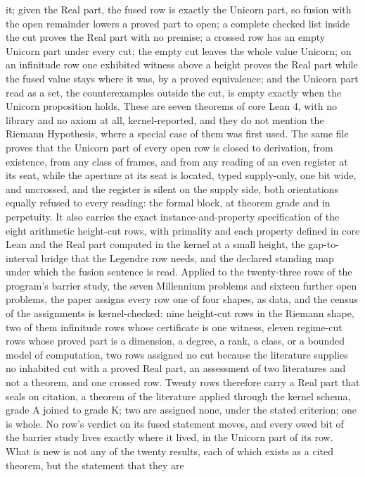 \documentclass[10pt,twocolumn]{article}
\begin{document}
{\begin{minipage}{\textwidth}
{it; given the Real part, the fused row is exactly the Unicorn part, so
fusion with the open remainder lowers a proved part to open; a complete
checked list inside the cut proves the Real part with no premise; a
crossed row has an empty Unicorn part under every cut; the empty cut
leaves the whole value Unicorn; on an infinitude row one exhibited
witness above a height proves the Real part while the fused value stays
where it was, by a proved equivalence; and the Unicorn part read as a
set, the counterexamples outside the cut, is empty exactly when the
Unicorn proposition holds. These are seven theorems of core Lean 4, with
no library and no axiom at all, kernel-reported, and they do not mention
the Riemann Hypothesis, where a special case of them was first used. The
same file proves that the Unicorn part of every open row is closed to
derivation, from existence, from any class of frames, and from any
reading of an even register at its seat, while the aperture at its seat
is located, typed supply-only, one bit wide, and uncrossed, and the
register is silent on the supply side, both orientations equally refused
to every reading: the formal block, at theorem grade and in perpetuity.
It also carries the exact instance-and-property specification of the
eight arithmetic height-cut rows, with primality and each property
defined in core Lean and the Real part computed in the kernel at a small
height, the gap-to-interval bridge that the Legendre row needs, and the
declared standing map under which the fusion sentence is read. Applied
to the twenty-three rows of the program's barrier study, the seven
Millennium problems and sixteen further open problems, the paper assigns
every row one of four shapes, as data, and the census of the assignments
is kernel-checked: nine height-cut rows in the Riemann shape, two of
them infinitude rows whose certificate is one witness, eleven regime-cut
rows whose proved part is a dimension, a degree, a rank, a class, or a
bounded model of computation, two rows assigned no cut because the
literature supplies no inhabited cut with a proved Real part, an
assessment of two literatures and not a theorem, and one crossed row.
Twenty rows therefore carry a Real part that seals on citation, a
theorem of the literature applied through the kernel schema, grade A
joined to grade K; two are assigned none, under the stated criterion;
one is whole. No row's verdict on its fused statement moves, and every
owed bit of the barrier study lives exactly where it lived, in the
Unicorn part of its row. What is new is not any of the twenty results,
each of which exists as a cited theorem, but the statement that they are
}
\end{minipage}}
\end{document}
